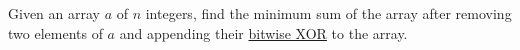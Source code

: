 Given an array $a$ of $n$ integers, find the minimum sum of the array after removing two elements of $a$ and appending their \href{https://en.wikipedia.org/wiki/Bitwise_operation#XOR}{bitwise XOR} to the array.
